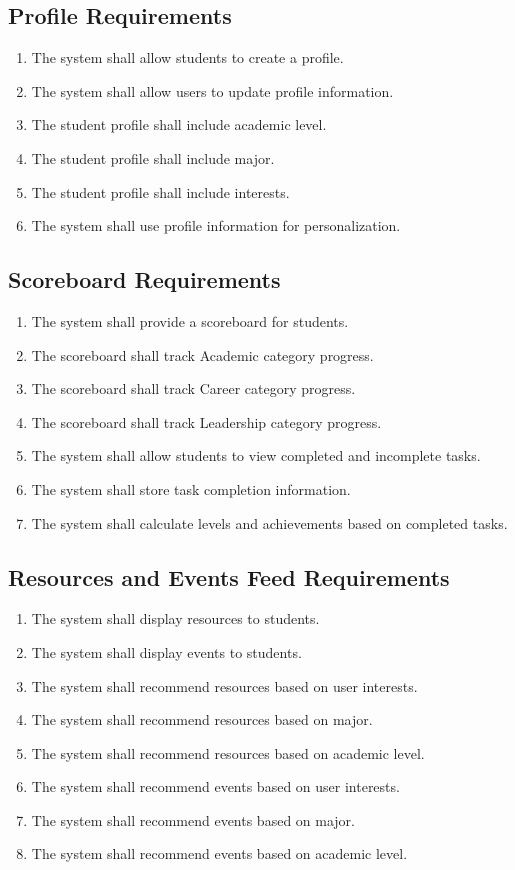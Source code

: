 \documentclass{scrreprt}
\begin{document}
\subsection{Profile Requirements}
\begin{enumerate}
    \item The system shall allow students to create a profile.
    \item The system shall allow users to update profile information.
    \item The student profile shall include academic level.
    \item The student profile shall include major.
    \item The student profile shall include interests.
    \item The system shall use profile information for personalization.
\end{enumerate}

\subsection{Scoreboard Requirements}
\begin{enumerate}
    \item The system shall provide a scoreboard for students.
    \item The scoreboard shall track Academic category progress.
    \item The scoreboard shall track Career category progress.
    \item The scoreboard shall track Leadership category progress.
    \item The system shall allow students to view completed and incomplete tasks.
    \item The system shall store task completion information.
    \item The system shall calculate levels and achievements based on completed tasks.
\end{enumerate}

\subsection{Resources and Events Feed Requirements}
\begin{enumerate}
    \item The system shall display resources to students.
    \item The system shall display events to students.
    \item The system shall recommend resources based on user interests.
    \item The system shall recommend resources based on major.
    \item The system shall recommend resources based on academic level.
    \item The system shall recommend events based on user interests.
    \item The system shall recommend events based on major.
    \item The system shall recommend events based on academic level.
\end{enumerate}
\end{document}
